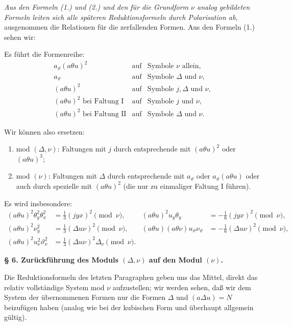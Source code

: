 \documentclass[11pt]{article}
\newcommand{\A}{\Delta}
\begin{document}
\emph{Aus den Formeln (1.) und (2.) und den für die Grundform $\nu$ analog gebildeten Formeln leiten sich alle späteren Reduktionsformeln durch Polarisation ab}, ausgenommen die Relationen für die zerfallenden Formen. Aus den Formeln (1.) sehen wir:

Es führt die Formenreihe:
\[
\begin{array}{rcl}
a_\vartheta(a\theta u)^2 &\text{auf}& \text{Symbole }\nu\text{ allein},\\[0.2em]
a_\vartheta &\text{auf}& \text{Symbole }\A\text{ und }\nu,\\[0.2em]
(a\theta u)^2 &\text{auf}& \text{Symbole }j,\A\text{ und }\nu,\\[0.2em]
(a\theta u)^2\text{ bei Faltung I} &\text{auf}& \text{Symbole }j\text{ und }\nu,\\[0.2em]
(a\theta u)^2\text{ bei Faltung II} &\text{auf}& \text{Symbole }\A\text{ und }\nu.
\end{array}
\]

Wir können also ersetzen:
\begin{enumerate}
\item mod $(\A,\nu)$: Faltungen mit $j$ durch entsprechende mit $(a\theta u)^2$ oder $(a\theta u)^3$;
\item mod $(\nu)$: Faltungen mit $\A$ durch entsprechende mit $a_\vartheta$ oder $a_\vartheta(a\theta u)$ oder auch durch spezielle mit $(a\theta u)^2$ (die nur zu einmaliger Faltung I führen).
\end{enumerate}
Es wird insbesondere:
\[
\begin{aligned}
(a\theta u)^2\theta_y^2\theta_x^2&=\frac13(jyx)^2\pmod{\nu},&
(a\theta u)^2u_y\theta_y&=-\frac16(jyx)^2\pmod{\nu},\\
(a\theta u)^2\nu_y^2&=\frac13(\A u\nu)^2\pmod{\nu},&
(a\theta u)(a\theta\nu)u_\vartheta\nu_\vartheta&=-\frac16(\A u\nu)^2\pmod{\nu},\\
(a\theta u)^2u_\nu^2\vartheta_\nu^2&=\frac13(\A u\nu)^2\A_\nu\pmod{\nu}.
\end{aligned}
\]

\begin{center}
\textbf{§ 6. \quad Zurückführung des Moduls $(\A,\nu)$ auf den Modul $(\nu)$.}
\end{center}

Die Reduktionsformeln des letzten Paragraphen geben uns das Mittel, direkt das relativ vollständige System mod $\nu$ aufzustellen; wir werden sehen, daß wir dem System der übernommenen Formen nur die Formen $\A$ und $(a\A u)=N$ beizufügen haben (analog wie bei der kubischen Form und überhaupt allgemein gültig).
\end{document}
